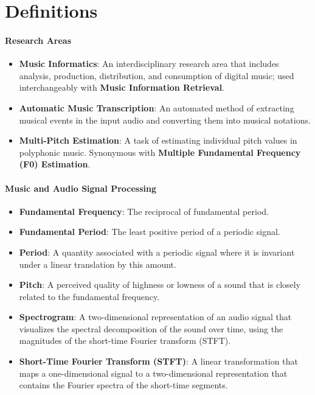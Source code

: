 \section{Definitions}

\paragraph{Research Areas}

\begin{itemize}
	\item \textbf{Music Informatics}: An interdisciplinary research area that includes analysis, production, distribution, and consumption  of digital music; used interchangeably with \textbf{Music Information Retrieval}.
	\item \textbf{Automatic Music Transcription}: An automated method of extracting musical events in the input audio and converting them into musical notations.
	\item \textbf{Multi-Pitch Estimation}: A task of estimating individual pitch values in polyphonic music. Synonymous with \textbf{Multiple Fundamental Frequency (F0) Estimation}.
\end{itemize}

\noindent 
\paragraph{Music and Audio Signal Processing}

\begin{itemize}
	\item \textbf{Fundamental Frequency}: The reciprocal of fundamental period.
	\item \textbf{Fundamental Period}: The least positive period of a periodic signal.
	\item \textbf{Period}: A quantity associated with a periodic signal where it is invariant under a linear translation by this amount.
	\item \textbf{Pitch}: A perceived quality of highness or lowness of a sound that is closely related to the fundamental frequency.
	\item \textbf{Spectrogram}: A two-dimensional representation of an audio signal that visualizes the spectral decomposition of the sound over time, using the magnitudes of the short-time Fourier transform (STFT).
	\item \textbf{Short-Time Fourier Transform (STFT)}: A linear transformation that maps a one-dimensional signal to a two-dimensional representation that contains the Fourier spectra of the short-time segments.
\end{itemize}

